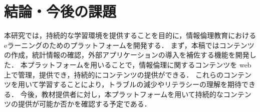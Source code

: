 \section{結論・今後の課題}\label{sec5}
本研究では，持続的な学習環境を提供することを目的に，情報倫理教育におけるeラーニングのためのプラットフォームを開発する．
まず，本稿ではコンテンツの作成，統計情報の確認，外部アプリケーションの導入を補佐する機能を開発した．
本プラットフォームを用いることで，情報倫理に関するコンテンツを web 上で管理，提供でき，持続的にコンテンツの提供ができる．
これらのコンテンツを用いて学習することにより，トラブルの減少やリテラシーの理解を期待できる．
今後，教材提供者に対し，本プラットフォームを用いて持続的なコンテンツの提供が可能か否かを確認する予定である．
